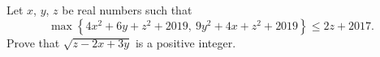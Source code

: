 Let $x$, $y$, $z$ be real numbers such that
\[\max\left\{4x^2+6y+z^2+2019,\ 9y^2+4x+z^2+2019\right\}\le2z+2017 .\]
Prove that $\sqrt{z-2x+3y}$ is a positive integer.
